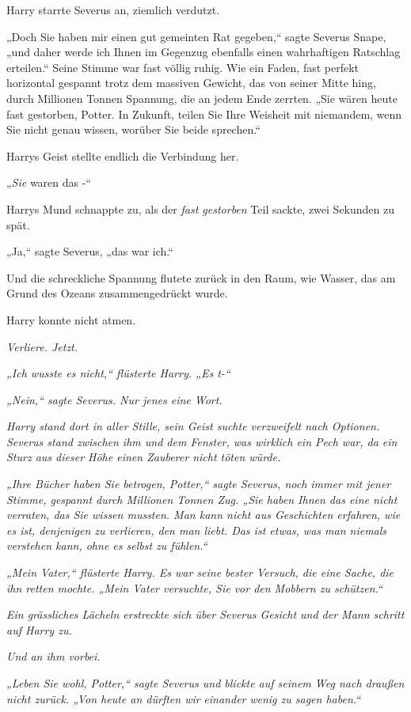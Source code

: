 {Harry starrte Severus an, ziemlich verdutzt.

„Doch Sie haben mir einen gut gemeinten Rat gegeben,“ sagte Severus Snape, „und daher werde ich Ihnen im Gegenzug ebenfalls einen wahrhaftigen Ratschlag erteilen.“ Seine Stimme war fast völlig ruhig. Wie ein Faden, fast perfekt horizontal gespannt trotz dem massiven Gewicht, das von seiner Mitte hing, durch Millionen Tonnen Spannung, die an jedem Ende zerrten. „Sie wären heute fast gestorben, Potter. In Zukunft, teilen Sie Ihre Weisheit mit niemandem, wenn Sie nicht genau wissen, worüber Sie beide sprechen.“

Harrys Geist stellte endlich die Verbindung her.

„\emph{Sie} waren das -“

Harrys Mund schnappte zu, als der \emph{fast gestorben} Teil sackte, zwei Sekunden zu spät.

„Ja,“ sagte Severus, „das war ich.“

Und die schreckliche Spannung flutete zurück in den Raum, wie Wasser, das am Grund des Ozeans zusammengedrückt wurde.

Harry konnte nicht atmen.

\emph{Verliere. Jetzt.}

\emph{„Ich wusste es nicht,“ flüsterte Harry. „Es t-“}

\emph{„Nein,“ sagte Severus. Nur jenes eine Wort.}

\emph{Harry stand dort in aller Stille, sein Geist suchte verzweifelt nach Optionen. Severus stand zwischen ihm und dem Fenster, was wirklich ein Pech war, da ein Sturz aus dieser Höhe einen Zauberer nicht töten würde.}

\emph{„Ihre Bücher haben Sie betrogen, Potter,“ sagte Severus, noch immer mit jener Stimme, gespannt durch Millionen Tonnen Zug. „Sie haben Ihnen das eine nicht verraten, das Sie wissen mussten. Man kann nicht aus Geschichten erfahren, wie es ist, denjenigen zu verlieren, den man liebt. Das ist etwas, was man niemals verstehen kann, ohne es selbst zu fühlen.“}

\emph{„Mein Vater,“ flüsterte Harry. Es war seine bester Versuch, die eine Sache, die ihn retten mochte. „Mein Vater versuchte, Sie vor den Mobbern zu schützen.“}

\emph{Ein grässliches Lächeln erstreckte sich über Severus Gesicht und der Mann schritt auf Harry zu.}

\emph{Und an ihm vorbei.}

\emph{„Leben Sie wohl, Potter,“ sagte Severus und blickte auf seinem Weg nach draußen nicht zurück. „Von heute an dürften wir} \emph{einander} \emph{wenig zu sagen haben.“}

}
